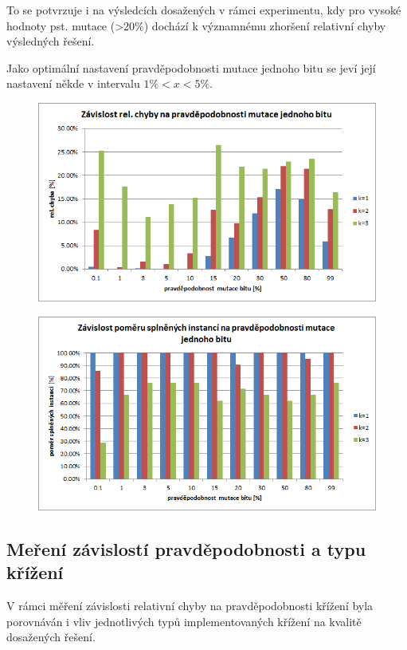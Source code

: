 \documentclass[12pt,oneside,a4paper]{article}
\begin{document}
To se potvrzuje i na výsledcích dosažených v rámci experimentu, kdy pro vysoké hodnoty pst. mutace (>20\%) dochází k významnému zhoršení relativní chyby výsledných řešení.

Jako optimální nastavení pravděpodobnosti mutace jednoho bitu se jeví její nastavení někde v intervalu $1\% < x < 5\%$.

\begin{figure}[ht]
\centering
\includegraphics[scale=0.9]{obr/mut-err.png}
\end{figure}


\begin{figure}[ht]
\centering
\includegraphics[scale=0.9]{obr/mut-sat.png}
\end{figure}
\newpage
\FloatBarrier

\subsection{Meření závislostí pravděpodobnosti a typu křížení}

V rámci měření závislosti relativní chyby na pravděpodobnosti křížení byla porovnáván i vliv jednotlivých typů implementovaných křížení na kvalitě dosažených řešení.
\end{document}
